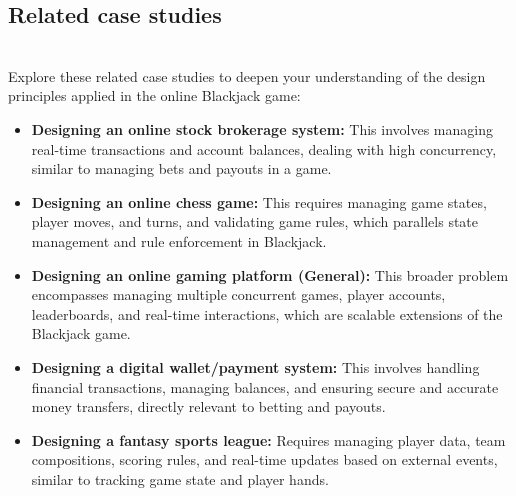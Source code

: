 \subsection{Related case studies}\label{ZmhADjbi2ACsgH6q8t7iK}
\\
Explore these related case studies to deepen your understanding of the design principles applied in the online Blackjack game:

\begin{itemize}
\item
\textbf{Designing an online stock brokerage system:} This involves managing real-time transactions and account balances, dealing with high concurrency, similar to managing bets and payouts in a game.
\item
\textbf{Designing an online chess game:} This requires managing game states, player moves, and turns, and validating game rules, which parallels state management and rule enforcement in Blackjack.
\item
\textbf{Designing an online gaming platform (General):} This broader problem encompasses managing multiple concurrent games, player accounts, leaderboards, and real-time interactions, which are scalable extensions of the Blackjack game.
\item
\textbf{Designing a digital wallet/payment system:} This involves handling financial transactions, managing balances, and ensuring secure and accurate money transfers, directly relevant to betting and payouts.
\item
\textbf{Designing a fantasy sports league:} Requires managing player data, team compositions, scoring rules, and real-time updates based on external events, similar to tracking game state and player hands.
\end{itemize}

